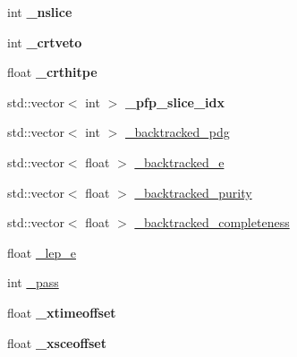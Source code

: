 \begin{DoxyCompactItemize}
\item 
\hypertarget{classanalysis_1_1DefaultAnalysis_a3eddf49910782afed7f324755fffe681}{int {\bfseries \-\_\-nslice}}\label{classanalysis_1_1DefaultAnalysis_a3eddf49910782afed7f324755fffe681}

\item 
\hypertarget{classanalysis_1_1DefaultAnalysis_a84ce9904fa527012a65c2be203a38d38}{int {\bfseries \-\_\-crtveto}}\label{classanalysis_1_1DefaultAnalysis_a84ce9904fa527012a65c2be203a38d38}

\item 
\hypertarget{classanalysis_1_1DefaultAnalysis_a900ec35e3ca4a00d4625a1e632bb6b40}{float {\bfseries \-\_\-crthitpe}}\label{classanalysis_1_1DefaultAnalysis_a900ec35e3ca4a00d4625a1e632bb6b40}

\item 
\hypertarget{classanalysis_1_1DefaultAnalysis_acbf0c279993cbefca72f38bc5e9f6627}{std\-::vector$<$ int $>$ {\bfseries \-\_\-pfp\-\_\-slice\-\_\-idx}}\label{classanalysis_1_1DefaultAnalysis_acbf0c279993cbefca72f38bc5e9f6627}

\item 
std\-::vector$<$ int $>$ \hyperlink{classanalysis_1_1DefaultAnalysis_a28bd59dce75b8fd3be70bd4996354ae9}{\-\_\-backtracked\-\_\-pdg}
\item 
std\-::vector$<$ float $>$ \hyperlink{classanalysis_1_1DefaultAnalysis_a2c16b4988d0bccf8b7ef96a52c173b80}{\-\_\-backtracked\-\_\-e}
\item 
std\-::vector$<$ float $>$ \hyperlink{classanalysis_1_1DefaultAnalysis_ad08d9b30c434685e350c5f292d4df08b}{\-\_\-backtracked\-\_\-purity}
\item 
std\-::vector$<$ float $>$ \hyperlink{classanalysis_1_1DefaultAnalysis_a60ef3ec6e332c118c088e0203fb858d6}{\-\_\-backtracked\-\_\-completeness}
\item 
float \hyperlink{classanalysis_1_1DefaultAnalysis_ab00e533228597e83340a23d04b986086}{\-\_\-lep\-\_\-e}
\item 
int \hyperlink{classanalysis_1_1DefaultAnalysis_a8d58d05d4b0750a67babff41beece3ac}{\-\_\-pass}
\item 
\hypertarget{classanalysis_1_1DefaultAnalysis_a6ab8489552ea4bfceb0301df80100c65}{float {\bfseries \-\_\-xtimeoffset}}\label{classanalysis_1_1DefaultAnalysis_a6ab8489552ea4bfceb0301df80100c65}

\item 
\hypertarget{classanalysis_1_1DefaultAnalysis_a31b53194403f7db533cd349a0f85a62c}{float {\bfseries \-\_\-xsceoffset}}\label{classanalysis_1_1DefaultAnalysis_a31b53194403f7db533cd349a0f85a62c}


\end{DoxyCompactItemize}
